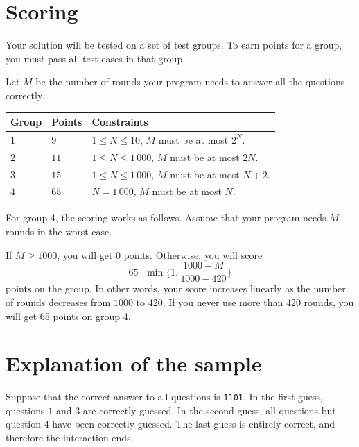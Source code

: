 \section*{Scoring}
Your solution will be tested on a set of test groups.
To earn points for a group, you must pass all test cases in that group.

Let $M$ be the number of rounds your program needs to answer all the questions correctly.

\noindent
\begin{tabular}{| l | l | p{12cm} |}
  \hline
  \textbf{Group} & \textbf{Points} & \textbf{Constraints} \\ \hline
  $1$    & $9$       & $1 \le N \le 10$, $M$ must be at most $2^N$. \\ \hline
  $2$    & $11$      & $1 \le N \le 1\,000$, $M$ must be at most $2N$. \\ \hline
  $3$    & $15$      & $1 \le N \le 1\,000$, $M$ must be at most $N + 2$. \\ \hline
  $4$    & $65$      & $N = 1\,000$, $M$ must be at most $N$. \\ \hline
\end{tabular}

For group 4, the scoring works as follows. Assume that your program needs $M$ rounds in the worst case.

If $M \geq 1000$, you will get $0$ points. Otherwise, you will score
\[ 65 \cdot \min \{ 1, \frac{1000-M}{1000-420} \} \]
points on the group. In other words, your score increases linearly as the number of rounds decreases from $1000$ to $420$.
If you never use more than $420$ rounds, you will get 65 points on group 4.

\section*{Explanation of the sample}
Suppose that the correct answer to all questions is \texttt{1101}. In the first guess, questions $1$ and $3$ are correctly
guessed. In the second guess, all questions but question $4$ have been correctly guessed. The last guess is entirely correct,
and therefore the interaction ends.

